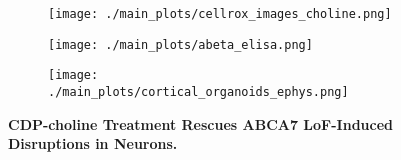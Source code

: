 \begin{figure}[H]
    \begin{subfigure}[t]{.4\textwidth}
        \caption{}
        \texttt{[image: ./main\_plots/cellrox\_images\_choline.png]}        
    \end{subfigure}
    \begin{subfigure}[t]{.39\textwidth}
        \caption{}
        \texttt{[image: ./main\_plots/abeta\_elisa.png]}        
    \end{subfigure}  
    \begin{subfigure}[t]{.2\textwidth}
        \caption{}
        \texttt{[image: ./main\_plots/cortical\_organoids\_ephys.png]}        
    \end{subfigure} 
    \caption{
        \textbf{CDP-choline Treatment Rescues ABCA7 LoF-Induced Disruptions in Neurons.}\\
    }
    \label{fig:main_choline}
\end{figure}
